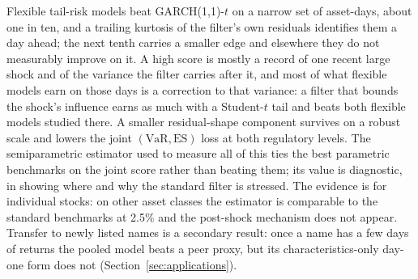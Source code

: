 \documentclass[11pt]{article}
\newcommand{\VaR}{\mathrm{VaR}}
\newcommand{\ES}{\mathrm{ES}}
\theoremstyle{remark}
\begin{document}
Flexible tail-risk models beat GARCH(1,1)-$t$ on a narrow set of asset-days, about one in ten, and a trailing kurtosis of the filter's own residuals identifies them a day ahead; the next tenth carries a smaller edge and elsewhere they do not measurably improve on it. A high score is mostly a record of one recent large shock and of the variance the filter carries after it, and most of what flexible models earn on those days is a correction to that variance: a filter that bounds the shock's influence earns as much with a Student-$t$ tail and beats both flexible models studied there. A smaller residual-shape component survives on a robust scale and lowers the joint $(\VaR,\ES)$ loss at both regulatory levels. The semiparametric estimator used to measure all of this ties the best parametric benchmarks on the joint score rather than beating them; its value is diagnostic, in showing where and why the standard filter is stressed. The evidence is for individual stocks: on other asset classes the estimator is comparable to the standard benchmarks at 2.5\% and the post-shock mechanism does not appear. Transfer to newly listed names is a secondary result: once a name has a few days of returns the pooled model beats a peer proxy, but its characteristics-only day-one form does not (Section~\ref{sec:applications}).
\end{document}
